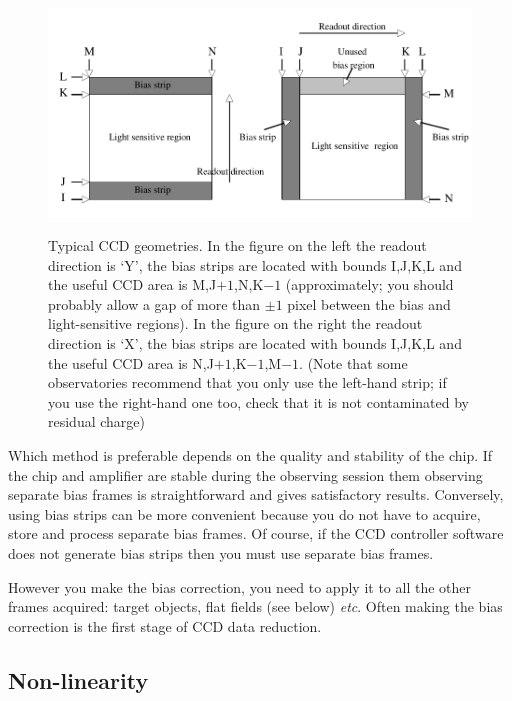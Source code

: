 \documentclass[twoside,11pt]{starlink}
\begin{document}
\begin{figure}[htbp]
   \centering
   \includegraphics[width=\textwidth]{sc5_biasstrips}
   \begin{quote}
   \caption[Typical CCD geometries]{Typical CCD geometries.
    In the figure on the left the readout direction is `Y', the bias
    strips are located with bounds I,J,K,L and the useful CCD area is
    M,J$+1$,N,K$-1$ (approximately; you should probably allow a gap of
    more than $\pm 1$ pixel between the bias and light-sensitive regions).
    In the figure on the right the readout direction is `X', the bias
    strips are located with bounds I,J,K,L and the useful CCD area is
    N,J$+1$,K$-1$,M$-1$. (Note that some observatories recommend that you
    only use the left-hand strip; if you use the right-hand one too, check
    that it is not contaminated by residual charge)
   \label{BIAS_STRIPS} }
   \end{quote}
\end{figure}

Which method is preferable depends on the quality and stability of the
chip.  If the chip and amplifier are stable during the observing session
them observing separate bias frames is straightforward and gives
satisfactory results.  Conversely, using bias strips can be more
convenient because you do not have to acquire, store and process separate
bias frames.  Of course, if the CCD controller software does not generate
bias strips then you must use separate bias frames.

However you make the bias correction, you need to apply it to all the
other frames acquired: target objects, flat fields (see below) \emph{etc}.
Often making the bias correction is the first stage of CCD data reduction.

\subsection{Non-linearity}
\end{document}
